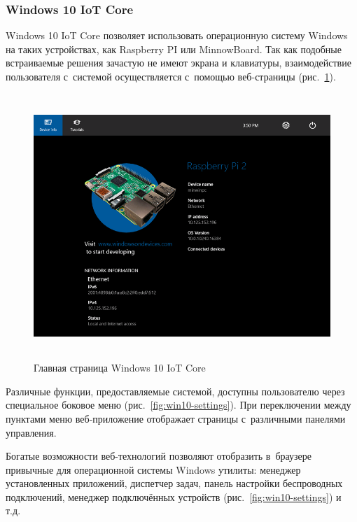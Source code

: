 
\subsubsection{Windows 10 IoT Core}

Windows 10 IoT Core позволяет использовать операционную систему Windows на таких устройствах, как Raspberry PI или MinnowBoard. Так как подобные встраиваемые решения зачастую не имеют экрана и клавиатуры, взаимодействие пользователя с~системой осуществляется с~помощью веб-страницы (рис.~\ref{fig:win10-device-info}).

\begin{figure}[h!]
  \centering
  \includegraphics[height=10cm]{img/win10-device-info}
  \vspace*{12pt}
  \caption{Главная страница Windows 10 IoT Core}\label{fig:win10-device-info}
\end{figure}

Различные функции, предоставляемые системой, доступны пользователю через специальное боковое меню (рис.~\ref{fig:win10-settings}). При переключении между пунктами меню веб-приложение отображает страницы с~различными панелями управления. \par

Богатые возможности веб-технологий позволяют отобразить в~браузере привычные для операционной системы Windows утилиты: менеджер установленных приложений, диспетчер задач, панель настройки беспроводных подключений, менеджер подключённых устройств (рис.~\ref{fig:win10-settings}) и т.д.


